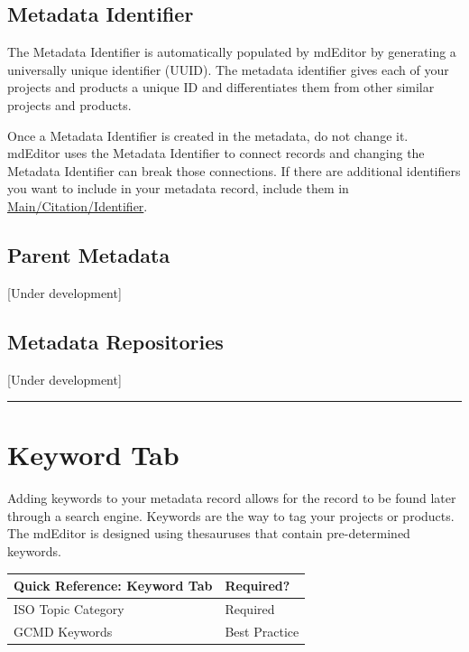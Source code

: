 \documentclass[
]{book}
\makeatletter
\newenvironment{kframe}{%
\medskip{}
\setlength{\fboxsep}{.8em}
 \def\at@end@of@kframe{}%
 \ifinner\ifhmode%
  \def\at@end@of@kframe{\end{minipage}}%
  \begin{minipage}{\columnwidth}%
 \fi\fi%
 \def\FrameCommand##1{\hskip\@totalleftmargin \hskip-\fboxsep
 \colorbox{shadecolor}{##1}\hskip-\fboxsep
     \hskip-\linewidth \hskip-\@totalleftmargin \hskip\columnwidth}%
 \MakeFramed {\advance\hsize-\width
   \@totalleftmargin\z@ \linewidth\hsize
   \@setminipage}}%
 {\par\unskip\endMakeFramed%
 \at@end@of@kframe}
\newenvironment{rmdblock}[1]
  {
  \begin{itemize}
  \renewcommand{\labelitemi}{
    \raisebox{-.7\height}[0pt][0pt]{
      {\setkeys{Gin}{width=3em,keepaspectratio}\texttt{[image: images/\#1]}}
    }
  }
  \setlength{\fboxsep}{1em}
  \begin{kframe}
  \item
  }
  {
  \end{kframe}
  \end{itemize}
  }
\newenvironment{rmdcaution}
  {\begin{rmdblock}{caution}}
  {\end{rmdblock}}
\makeatother
\begin{document}
\hypertarget{metadata-identifier}{%
\subsection{Metadata Identifier}\label{metadata-identifier}}

The Metadata Identifier is automatically populated by mdEditor by generating a universally unique identifier (UUID). The metadata identifier gives each of your projects and products a unique ID and differentiates them from other similar projects and products.

\begin{rmdcaution}
Once a Metadata Identifier is created in the metadata, do not change it.
mdEditor uses the Metadata Identifier to connect records and changing
the Metadata Identifier can break those connections. If there are
additional identifiers you want to include in your metadata record,
include them in
\protect\hyperlink{project-main}{Main/Citation/Identifier}.
\end{rmdcaution}

\hypertarget{parent-metadata}{%
\subsection{Parent Metadata}\label{parent-metadata}}

{[}Under development{]}

\hypertarget{metadata-repositories}{%
\subsection{Metadata Repositories}\label{metadata-repositories}}

{[}Under development{]}

\begin{center}\rule{0.5\linewidth}{\linethickness}\end{center}

\hypertarget{project-keywords}{%
\section{Keyword Tab}\label{project-keywords}}

Adding keywords to your metadata record allows for the record to be found later through a search engine. Keywords are the way to tag your projects or products. The mdEditor is designed using thesauruses that contain pre-determined keywords.

\begin{longtable}[]{@{}ll@{}}
\toprule
Quick Reference: Keyword Tab & Required?\tabularnewline
\midrule
\endhead
ISO Topic Category & Required\tabularnewline
GCMD Keywords & Best Practice\tabularnewline
\bottomrule
\end{longtable}
\end{document}
